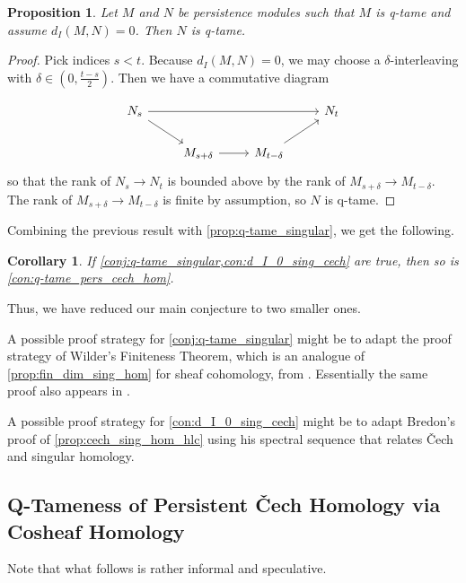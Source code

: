 \documentclass{amsart}
\theoremstyle{plain}
\newtheorem{cor}[thm]{Corollary}
\newtheorem{prop}[thm]{Proposition}
\theoremstyle{definition}
\begin{document}
\begin{prop}
Let $M$ and $N$ be persistence modules such that $M$ is q-tame and assume $d_I(M,N)=0$. Then $N$ is q-tame.
\end{prop}
\begin{proof}
Pick indices $s<t$. Because $d_I(M,N)=0$, we may choose a $\delta$-interleaving with $\delta\in\left(0,\frac{t-s}{2}\right)$. Then we have a commutative diagram 

\[
\begin{tikzcd}
N_s\arrow[rrr]\arrow[rd]&&&N_{t}\\
&M_{s+\delta}\arrow[r]&M_{t-\delta}\arrow[ru]&
\end{tikzcd}
\]
so that the rank of $N_s\to N_t$ is bounded above by the rank of $M_{s+\delta}\to M_{t-\delta}$. The rank of $M_{s+\delta}\to M_{t-\delta}$ is finite by assumption, so $N$ is q-tame.
\end{proof}

Combining the previous result with \cref{prop:q-tame_singular}, we get the following.

\begin{cor}
If \cref{conj:q-tame_singular,con:d_I_0_sing_cech} are true, then so is \cref{con:q-tame_pers_cech_hom}.
\end{cor}

Thus, we have reduced our main conjecture to two smaller ones.

A possible proof strategy for \cref{conj:q-tame_singular} might be to adapt the proof strategy of Wilder's Finiteness Theorem, which is an analogue of \cref{prop:fin_dim_sing_hom} for sheaf cohomology, from \cite[Section II.17]{MR1481706}. Essentially the same proof also appears in \cite[Section III.10]{MR842190}.

A possible proof strategy for \cref{con:d_I_0_sing_cech} might be to adapt Bredon's proof of \cref{prop:cech_sing_hom_hlc} using his spectral sequence that relates \v{C}ech and singular homology.

\subsection{Q-Tameness of Persistent \v{C}ech Homology via Cosheaf Homology}\label{sec:cosheaf}
Note that what follows is rather informal and speculative.
\end{document}
